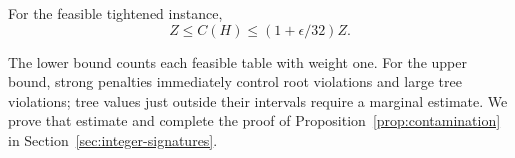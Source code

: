 \begin{proposition}\label{prop:contamination}
For the feasible tightened instance,
\[
Z\le C(H)\le(1+\epsilon/32)Z.
\]
\end{proposition}

The lower bound counts each feasible table with weight one.  For the
upper bound, strong penalties immediately control root violations and
large tree violations; tree values just outside their intervals require
a marginal estimate.  We prove that estimate and complete the proof of
Proposition~\ref{prop:contamination} in
Section~\ref{sec:integer-signatures}.
